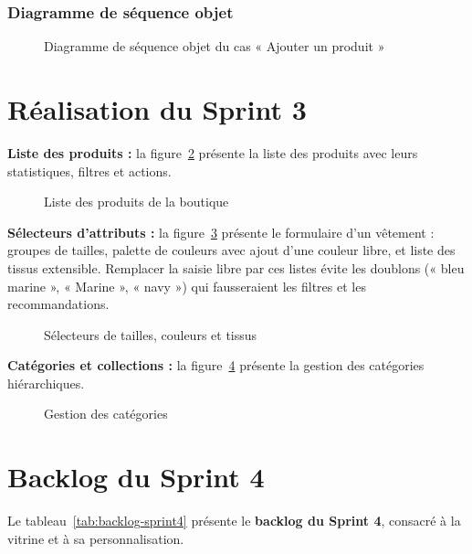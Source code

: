 \subsubsection{Diagramme de séquence objet}
\begin{figure}[H]
    \centering
    \caption{Diagramme de séquence objet du cas « Ajouter un produit »}
    \label{fig:dso-produit}
\end{figure}

\section{Réalisation du Sprint 3}
\textbf{Liste des produits :} la figure~\ref{fig:ui-produits} présente la liste des produits avec leurs statistiques, filtres et actions.
\begin{figure}[H]
    \centering
    \caption{Liste des produits de la boutique}
    \label{fig:ui-produits}
\end{figure}

\textbf{Sélecteurs d'attributs :} la figure~\ref{fig:ui-attributs} présente le formulaire d'un vêtement : groupes de tailles, palette de couleurs avec ajout d'une couleur libre, et liste des tissus extensible. Remplacer la saisie libre par ces listes évite les doublons (« bleu marine », « Marine », « navy ») qui fausseraient les filtres et les recommandations.
\begin{figure}[H]
    \centering
    \caption{Sélecteurs de tailles, couleurs et tissus}
    \label{fig:ui-attributs}
\end{figure}

\textbf{Catégories et collections :} la figure~\ref{fig:ui-categories} présente la gestion des catégories hiérarchiques.
\begin{figure}[H]
    \centering
    \caption{Gestion des catégories}
    \label{fig:ui-categories}
\end{figure}

\section{Backlog du Sprint 4}
Le tableau~\ref{tab:backlog-sprint4} présente le \textbf{backlog du Sprint 4}, consacré à la vitrine et à sa personnalisation.

